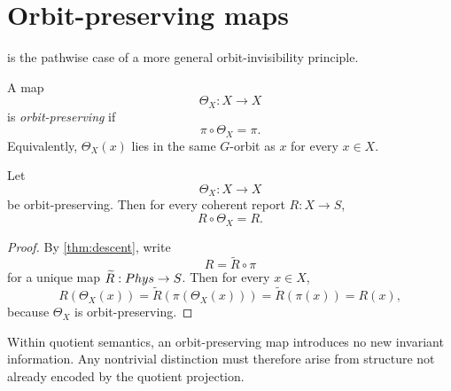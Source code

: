 \section{Orbit-preserving maps}
\label{sec:orbit-invisibility}
 is the pathwise case of a more general
orbit-invisibility principle.
\begin{definition}
	A map
	\[
		\Theta_X:X\to X
	\]
	is \emph{orbit-preserving} if
	\[
		\pi\circ\Theta_X=\pi.
	\]
	Equivalently, \(\Theta_X(x)\) lies in the same \(G\)-orbit as \(x\) for
	every \(x\in X\).
\end{definition}
\begin{theorem}
	Let
	\[
		\Theta_X:X\to X
	\]
	be orbit-preserving. Then for every coherent report \(R:X\to S\),
	\[
		R\circ \Theta_X=R.
	\]
\end{theorem}
\begin{proof}
	By \cref{thm:descent}, write
	\[
		R=\widetilde R\circ\pi
	\]
	for a unique map \(\widetilde R:Phys\to S\). Then for every \(x\in X\),
	\[
		R(\Theta_X(x))
		=
		\widetilde R(\pi(\Theta_X(x)))
		=
		\widetilde R(\pi(x))
		=
		R(x),
	\]
	because \(\Theta_X\) is orbit-preserving.
\end{proof}
\begin{remark}
	Within quotient semantics, an orbit-preserving map introduces no new
	invariant information. Any nontrivial distinction must therefore arise
	from structure not already encoded by the quotient projection.
\end{remark}
